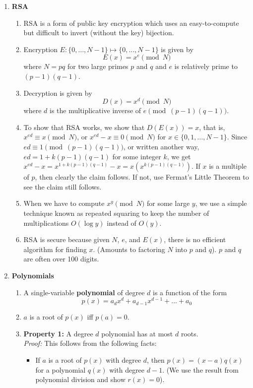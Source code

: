 \documentclass[10pt]{article}
\begin{document}
\begin{multicols}{2}
\begin{enumerate}
    \item \textbf{RSA}
    \begin{enumerate}
        \item RSA is a form of public key encryption which uses an easy-to-compute but difficult to invert (without the key) bijection.
        \item Encryption $E: \{0,\hdots,N-1\} \mapsto \{0,\hdots,N-1\}$ is given by $$E(x)=x^e \pmod{N}$$ where $N=pq$ for two large primes $p$ and $q$ and $e$ is relatively prime to $(p-1)(q-1)$.
        \item Decryption is given by $$D(x)=x^d \pmod{N}$$ where $d$ is the multiplicative inverse of $e \pmod{(p-1)(q-1)}$.
        \item To show that RSA works, we show that $D(E(x))=x$, that is, $x^{ed} \equiv x \pmod{N}$, or $x^{ed} - x \equiv 0 \pmod{N}$ for $x \in\{0,1, \ldots, N-1\}$. Since $ed \equiv 1 \pmod{(p-1)(q-1)}$, or written another way, $ed = 1 + k(p-1)(q-1)$ for some integer $k$, we get $x^{ed} - x = x^{1 + k(p-1)(q-1)} - x = x(x^{k(p-1)(q-1)})$. If $x$ is a multiple of $p$, then clearly the claim follows. If not, use Fermat's Little Theorem to see the claim still follows. 
        \item When we have to compute $x^y \pmod{N}$ for some large $y$, we use a simple technique known as repeated squaring to keep the number of multiplications $O(\log y)$ instead of $O(y)$.
        \item RSA is secure because given $N$, $e$, and $E(x)$, there is no efficient algorithm for finding $x$. (Amounts to factoring $N$ into $p$ and $q$). $p$ and $q$ are often over 100 digits.
    \end{enumerate}
    \item \textbf{Polynomials} 
    \begin{enumerate}
    \item A single-variable \textbf{polynomial} of degree $d$ is a function of the form $$p(x)=a_dx^d+a_{d-1}x^{d-1}+\hdots+a_0$$ \item $a$ is a root of $p(x)$ iff $p(a)=0$.
    \item \textbf{Property 1:} A degree $d$ polynomial has at most $d$ roots. \\
    \textit{Proof:} This follows from the following facts:
    \begin{itemize}
        \item If $a$ is a root of $p(x)$ with degree $d$, then $p(x) = (x - a)q(x)$ for a polynomial $q(x)$ with degree $d - 1$. (We use the result from polynomial division and show $r(x)=0$).

\end{itemize}
\end{enumerate}
\end{enumerate}
\end{multicols}
\end{document}
